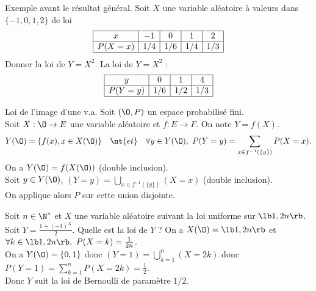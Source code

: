 \documentclass[11pt]{article}
\begin{document}
\begin{ex}{Exemple avant le résultat général.}{}
    Soit $X$ une variable aléatoire à valeurs dans $\{-1,0,1,2\}$ de loi
    \begin{eqnarray*}
        \begin{array}{|c|c|c|c|c|}
        \hline
        x&-1&0&1&2\\
        \hline
        P(X=x)&1/4&1/6&1/4&1/3\\
        \hline
        \end{array}
    \end{eqnarray*}
    Donner la loi de $Y=X^2$.
    \tcblower
    La loi de $Y=X^2$ :
    \begin{eqnarray*}
        \begin{array}{|c|c|c|c|c|}
            \hline
            y&0&1&4\\
            \hline
            P(Y=y)&1/6&1/2&1/3\\
            \hline
        \end{array}
    \end{eqnarray*}
\end{ex}

\begin{prop}{Loi de l'image d'une v.a.}{}
    Soit $(\O,P)$ un espace probabilisé fini.\\
    Soit $X:\O\to E$ une variable aléatoire et $f: E\to F$. On note $Y=f(X)$.
    \begin{equation*}
        Y(\O)=\{f(x),x\in X(\O)\} \quad \nt{et} \quad \forall y\in Y(\O), ~ P(Y=y)=\sum_{x\in f^{-1}(\{y\})}P(X=x).
    \end{equation*}
    \tcblower
    On a $Y(\O)=f(X(\O))$ (double inclusion).\\
    Soit $y\in Y(\O)$, $(Y=y)=\bigcup_{x\in f^{-1}(\{y\})}(X=x)$ (double inclusion).\\
    On applique alors $P$ sur cette union disjointe.
\end{prop}

\begin{ex}{}{}
    Soit $n\in\N^*$ et $X$ une variable aléatoire suivant la loi uniforme sur $\lb1,2n\rb$. Soit $Y=\frac{1+(-1)^X}{2}$. Quelle est la loi de $Y$ ?
    \tcblower
    On a $X(\O)=\lb1,2n\rb$ et $\forall k\in\lb1,2n\rb,~P(X=k)=\frac{1}{2n}$.\\
    On a $Y(\O)=\{0,1\}$ donc $(Y=1)=\bigcup_{k=1}^n(X=2k)$ donc $P(Y=1)=\sum_{k=1}^nP(X=2k)=\frac{1}{2}$.\\
    Donc $Y$ suit la loi de Bernoulli de paramètre $1/2$.
\end{ex}
\end{document}
